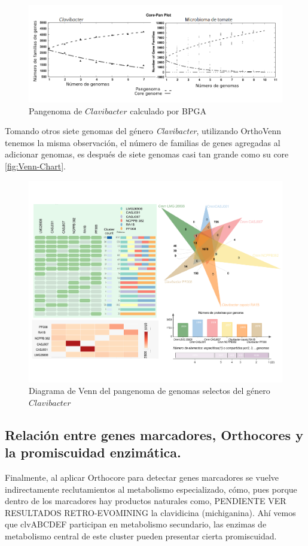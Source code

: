 \documentclass[]{article}
\begin{document}
\begin{figure}[h!tbp]
\centering
\includegraphics[angle = 0,scale = .5]{chapter1/bpga-pangenoma.png}
\caption[ X X]{\footnotesize{Pangenoma de $Clavibacter$ calculado por BPGA }}
\label{fig:bpga-pangenoma}
\end{figure}

Tomando otros siete genomas del género \emph{Clavibacter}, utilizando
OrthoVenn tenemos la misma observación, el número de familias de genes
agregadas al adicionar genomas, es después de siete genomas casi tan
grande como su core \autoref{fig:Venn-Chart}.

\begin{figure}[h!tbp]
\centering
\includegraphics[angle = 0,scale = .6]{chapter1/Venn_chart.pdf}
\caption[Diagrama de Venn del pangenoma de genomas selectos del género $Clavibacter$ ]{\footnotesize{Diagrama de Venn del pangenoma de genomas selectos del género $Clavibacter$ }}
\label{fig:Venn-Chart}
\end{figure}

\subsection{Relación entre genes marcadores, Orthocores y la
promiscuidad
enzimática.}\label{relacion-entre-genes-marcadores-orthocores-y-la-promiscuidad-enzimatica.}

Finalmente, al aplicar Orthocore para detectar genes marcadores se
vuelve indirectamente reclutamientos al metabolismo especializado, cómo,
pues porque dentro de los marcadores hay productos naturales como,
PENDIENTE VER RESULTADOS RETRO-EVOMINING la clavidicina (michiganina).
Ahí vemos que clvABCDEF participan en metabolismo secundario, las
enzimas de metabolismo central de este cluster pueden presentar cierta
promiscuidad.
\end{document}
